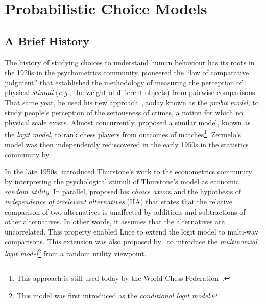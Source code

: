 \section{Probabilistic Choice Models}
\label{in:sec:models}

\subsection{A Brief History}

The history of studying choices to understand human behaviour has its roots in the 1920s in the psychometrics community.
\citet{thurstone1927law} pioneered the ``law of comparative judgment'' that established the methodology of measuring the perception of physical \emph{stimuli} (\textit{e.g.}, the weight of different objects) from pairwise comparisons.
That same year, he used his new approach~\citep{thurstone1927method}, today known as the \emph{probit model}, to study people's perception of the seriousness of crimes, a notion for which no physical scale exists.
Almost concurrently, \citet{zermelo1928berechnung} proposed a similar model, known as the \emph{logit model}, to rank chess players from outcomes of matches\footnote{This approach is still used today by the World Chess Federation~\citep{elo1978rating}.}.
Zermelo's model was then independently rediscovered in the early 1950s in the statistics community by~\citet{bradley1952rank}.

In the late 1950s, \citet{marschak1959binary} introduced Thurstone's work to the econometrics community by interpreting the psychological stimuli of Thurstone's model as economic \emph{random utility}.
In parallel, \citet{luce1959individual} proposed his \emph{choice axiom} and the hypothesis of \emph{independence of irrelevant alternatives} (IIA) that states that the relative comparison of two alternatives is unaffected by additions and subtractions of other alternatives.
In other words, it assumes that the alternatives are uncorrelated.
This property enabled Luce to extend the logit model to multi-way comparisons.
This extension was also proposed by~\citet{mcfadden1973conditional} to introduce the \emph{multinomial logit model}\footnote{This model was first introduced as the \emph{conditional logit model}.} from a random utility viewpoint.

